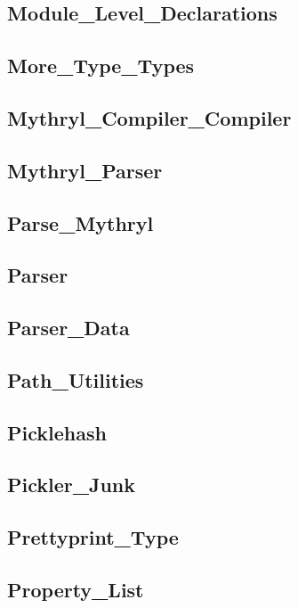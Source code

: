 \subsection{Module\_Level\_Declarations}		
\subsection{More\_Type\_Types}				
\subsection{Mythryl\_Compiler\_Compiler}		
\subsection{Mythryl\_Parser}				
\subsection{Parse\_Mythryl}				
\subsection{Parser}					
\subsection{Parser\_Data}				
\subsection{Path\_Utilities}				
\subsection{Picklehash}					
\subsection{Pickler\_Junk}				
\subsection{Prettyprint\_Type}				
\subsection{Property\_List}				
